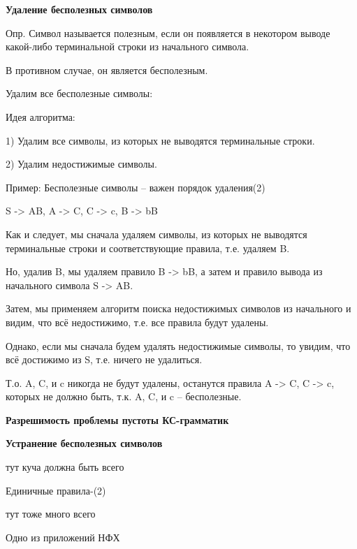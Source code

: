 \documentclass{article}
\begin{document}
\textbf{Удаление бесполезных символов}

 Опр. Символ называется полезным, если он появляется в
некотором выводе какой-либо терминальной строки из
начального символа.

 В противном случае, он является бесполезным.

 Удалим все бесполезные символы:

 Идея алгоритма:

1) Удалим все символы, из которых не выводятся терминальные
строки.

2) Удалим недостижимые символы.


Пример: Бесполезные символы – важен порядок удаления(2)

S -> AB, A -> C, C -> c, B -> bB

 Как и следует, мы сначала удаляем символы, из которых не
выводятся терминальные строки и соответствующие правила, т.е.
удаляем B.

 Но, удалив B, мы удаляем правило B -> bB, а затем и правило
вывода из начального символа S -> AB.

 Затем, мы применяем алгоритм поиска недостижимых символов
из начального и видим, что всё недостижимо, т.е. все правила
будут удалены.

 Однако, если мы сначала будем удалять недостижимые символы,
то увидим, что всё достижимо из S, т.е. ничего не удалиться.

 Т.о. A, C, и c никогда не будут удалены, останутся правила A -> C,
C -> c, которых не должно быть, т.к. A, C, и c – бесполезные.


\textbf{Разрешимость проблемы пустоты
КС-грамматик}




\textbf{Устранение бесполезных символов}




тут куча должна быть всего


Единичные правила-(2)



тут тоже много всего

Одно из приложений НФХ
\end{document}

